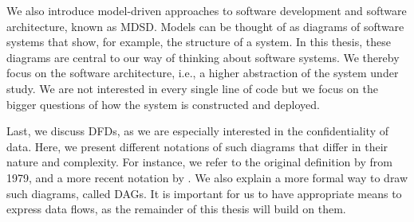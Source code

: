 We also introduce model-driven approaches to software development and software architecture, known as \acf{MDSD}.
Models can be thought of as diagrams of software systems that show, for example, the structure of a system.
In this thesis, these diagrams are central to our way of thinking about software systems.
We thereby focus on the software architecture, i.e., a higher abstraction of the system under study.
We are not interested in every single line of code but we focus on the bigger questions of how the system is constructed and deployed.

Last, we discuss \acfp{DFD}, as we are especially interested in the confidentiality of data.
Here, we present different notations of such diagrams that differ in their nature and complexity.
For instance, we refer to the original definition by \textcite{demarco_structure_1979} from 1979, and a more recent notation by \textcite{seifermann_unified_2021}.
We also explain a more formal way to draw such diagrams, called \acfp{DAG}.
It is important for us to have appropriate means to express data flows, as the remainder of this thesis will build on them.
